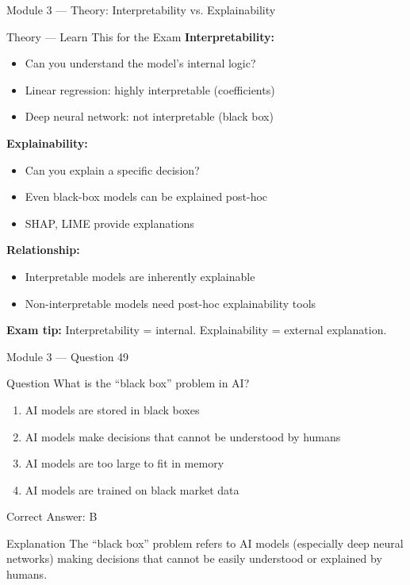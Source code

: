 \documentclass[aspectratio=169,10pt]{beamer}
\newcommand{\question}[1]{%
	\begin{block}{Question}
		#1
	\end{block}
}
\newcommand{\options}[4]{%
	\begin{enumerate}[label=\Alph*.,leftmargin=*]
		\item #1
		\item #2
		\item #3
		\item #4
	\end{enumerate}
}
\newcommand{\answerbox}[1]{%
	\begin{exampleblock}{Correct Answer: #1}
	\end{exampleblock}
}
\newcommand{\explain}[1]{%
	\begin{block}{Explanation}
		\small #1
	\end{block}
}
\newcommand{\theory}[1]{%
	\begin{block}{Theory --- Learn This for the Exam}
		\small #1
	\end{block}
}
\begin{document}
	\begin{frame}{Module 3 --- Theory: Interpretability vs. Explainability}
		\theory{
			\textbf{Interpretability:}
			\begin{itemize}
				\item Can you understand the model's internal logic?
				\item Linear regression: highly interpretable (coefficients)
				\item Deep neural network: not interpretable (black box)
			\end{itemize}
			\textbf{Explainability:}
			\begin{itemize}
				\item Can you explain a specific decision?
				\item Even black-box models can be explained post-hoc
				\item SHAP, LIME provide explanations
			\end{itemize}
			\textbf{Relationship:}
			\begin{itemize}
				\item Interpretable models are inherently explainable
				\item Non-interpretable models need post-hoc explainability tools
			\end{itemize}
			\textbf{Exam tip:} Interpretability = internal. Explainability = external explanation.
		}
	\end{frame}
	
	\begin{frame}{Module 3 --- Question 49}
		\question{What is the ``black box'' problem in AI?}
		\options{AI models are stored in black boxes}{AI models make decisions that cannot be understood by humans}{AI models are too large to fit in memory}{AI models are trained on black market data}
		\answerbox{B}
		\explain{The ``black box'' problem refers to AI models (especially deep neural networks) making decisions that cannot be easily understood or explained by humans.}
	\end{frame}
	
\end{document}
